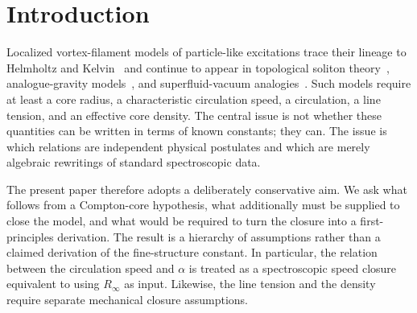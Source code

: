\documentclass[aps,pra,preprint,longbibliography,nofootinbib]{revtex4-2}
\begin{document}
\begin{abstract}
\end{abstract}

\maketitle

\section{Introduction}
\label{sec:intro}

Localized vortex-filament models of particle-like excitations trace
their lineage to Helmholtz and Kelvin~\cite{Helmholtz1867,Kelvin1867}
and continue to appear in topological soliton theory~\cite{FaddeevNiemi1997},
analogue-gravity models~\cite{Barcelo2005}, and superfluid-vacuum
analogies~\cite{Volovik2003}.  Such models require at least a core
radius, a characteristic circulation speed, a circulation, a line
tension, and an effective core density.  The central issue is not
whether these quantities can be written in terms of known constants;
they can.  The issue is which relations are independent physical
postulates and which are merely algebraic rewritings of standard
spectroscopic data.

The present paper therefore adopts a deliberately conservative aim.  We
ask what follows from a Compton-core hypothesis, what additionally must
be supplied to close the model, and what would be required to turn the
closure into a first-principles derivation.  The result is a hierarchy of
assumptions rather than a claimed derivation of the fine-structure
constant.  In particular, the relation between the circulation speed and
$\alpha$ is treated as a spectroscopic speed closure equivalent to using
$R_\infty$ as input.  Likewise, the line tension and the density require
separate mechanical closure assumptions.
\end{document}
